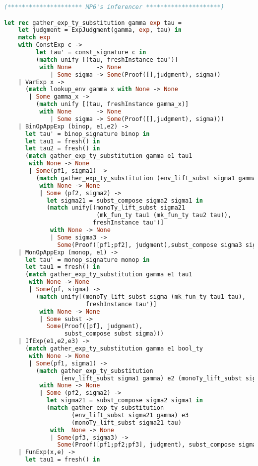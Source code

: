 \begin{lstlisting}[language=Caml, caption=definitions.ml]
(********************* MP6's inferencer *********************)

let rec gather_exp_ty_substitution gamma exp tau =
    let judgment = ExpJudgment(gamma, exp, tau) in
    match exp
    with ConstExp c ->
         let tau' = const_signature c in
         (match unify [(tau, freshInstance tau')]
          with None       -> None
             | Some sigma -> Some(Proof([],judgment), sigma))
    | VarExp x -> 
      (match lookup_env gamma x with None -> None
       | Some gamma_x ->
         (match unify [(tau, freshInstance gamma_x)]
          with None       -> None
             | Some sigma -> Some(Proof([],judgment), sigma)))
    | BinOpAppExp (binop, e1,e2) ->
      let tau' = binop_signature binop in
      let tau1 = fresh() in
      let tau2 = fresh() in
      (match gather_exp_ty_substitution gamma e1 tau1
       with None -> None
       | Some(pf1, sigma1) ->
         (match gather_exp_ty_substitution (env_lift_subst sigma1 gamma) e2 tau2
          with None -> None
          | Some (pf2, sigma2) ->
            let sigma21 = subst_compose sigma2 sigma1 in
            (match unify[(monoTy_lift_subst sigma21
                          (mk_fun_ty tau1 (mk_fun_ty tau2 tau)),
                         freshInstance tau')]
             with None -> None
             | Some sigma3 -> 
               Some(Proof([pf1;pf2], judgment),subst_compose sigma3 sigma21))))
    | MonOpAppExp (monop, e1) ->
      let tau' = monop_signature monop in
      let tau1 = fresh() in
      (match gather_exp_ty_substitution gamma e1 tau1
       with None -> None
       | Some(pf, sigma) ->
         (match unify[(monoTy_lift_subst sigma (mk_fun_ty tau1 tau),
                       freshInstance tau')]
          with None -> None
          | Some subst ->
            Some(Proof([pf], judgment),
                 subst_compose subst sigma)))
    | IfExp(e1,e2,e3) ->
      (match gather_exp_ty_substitution gamma e1 bool_ty
       with None -> None
       | Some(pf1, sigma1) ->
         (match gather_exp_ty_substitution
                (env_lift_subst sigma1 gamma) e2 (monoTy_lift_subst sigma1 tau)
          with None -> None
          | Some (pf2, sigma2) ->
            let sigma21 = subst_compose sigma2 sigma1 in
            (match gather_exp_ty_substitution
                   (env_lift_subst sigma21 gamma) e3
                   (monoTy_lift_subst sigma21 tau)
             with  None -> None
             | Some(pf3, sigma3) ->
               Some(Proof([pf1;pf2;pf3], judgment), subst_compose sigma3 sigma21))))
    | FunExp(x,e) ->
      let tau1 = fresh() in

\end{lstlisting}

